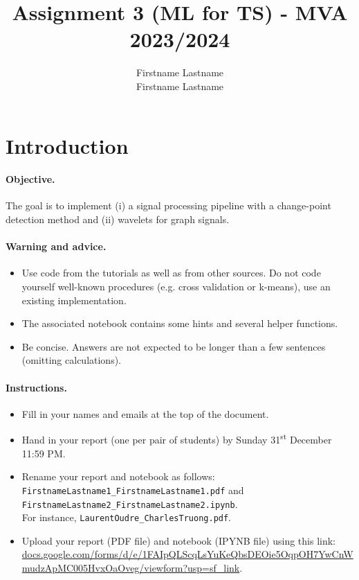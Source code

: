 \documentclass[11pt]{article}
\title{Assignment 3 (ML for TS) - MVA 2023/2024}
\author{
Firstname Lastname \email{youremail1@mail.com} \\ %
Firstname Lastname \email{youremail2@mail.com} %
}
\begin{document}
\maketitle

\section{Introduction}

\paragraph{Objective.} The goal is to implement (i) a signal processing pipeline with a change-point detection method and (ii) wavelets for graph signals.

\paragraph{Warning and advice.} 
\begin{itemize}
    \item Use code from the tutorials as well as from other sources. Do not code yourself well-known procedures (e.g. cross validation or k-means), use an existing implementation.
    \item The associated notebook contains some hints and several helper functions.
    \item Be concise. Answers are not expected to be longer than a few sentences (omitting calculations).
\end{itemize}



\paragraph{Instructions.}
\begin{itemize}
    \item Fill in your names and emails at the top of the document.
    \item Hand in your report (one per pair of students) by Sunday 31\textsuperscript{st} December 11:59 PM.
    \item Rename your report and notebook as follows:\\ \texttt{FirstnameLastname1\_FirstnameLastname1.pdf} and\\ \texttt{FirstnameLastname2\_FirstnameLastname2.ipynb}.\\
    For instance, \texttt{LaurentOudre\_CharlesTruong.pdf}.
    \item Upload your report (PDF file) and notebook (IPYNB file) using this link: \href{https://docs.google.com/forms/d/e/1FAIpQLScqLsYuKeQbsDEOie5OqpOH7YwCnWmudzApMC005HvxOaOveg/viewform?usp=sf_link}{docs.google.com/forms/d/e/1FAIpQLScqLsYuKeQbsDEOie5OqpOH7YwCnWmudzApMC005HvxOaOveg/viewform?usp=sf\_link}.
\end{itemize}
\end{document}
